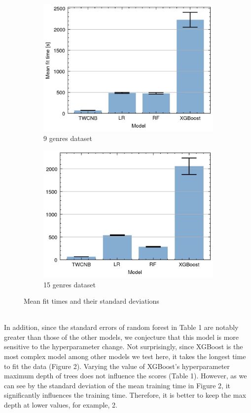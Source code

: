 \documentclass{article}
\begin{document}
\begin{figure}[h]
\begin{subfigure}{.5\textwidth}
  \centering
  \includegraphics[width=.9\linewidth]{../../gfx/redgenrestimes.jpg}
  \caption{9 genres dataset}
  \label{fig:sub1}
\end{subfigure}%
\begin{subfigure}{.5\textwidth}
  \centering
  \includegraphics[width=.9\linewidth]{../../gfx/allgenrestimes.jpg}
  \caption{15 genres dataset}
  \label{fig:figure2}
\end{subfigure}
\caption{\small{Mean fit times and their standard deviations}}
\label{fig:test}
\end{figure} \\
In addition, since the standard errors of random forest in Table 1 are notably greater than those of the other models, we conjecture that this model is more sensitive to the hyperparameter change. Not surprisingly, since XGBoost is the most complex model among other models we test here, it takes the longest time to fit the data (Figure 2). Varying the value of XGBoost's hyperparameter maximum depth of trees does not influence the scores (Table 1). However, as we can see by the standard deviation of the mean training time in Figure 2, it significantly influences the training time. Therefore, it is better to keep the max depth at lower values, for example, 2. 
\end{document}
